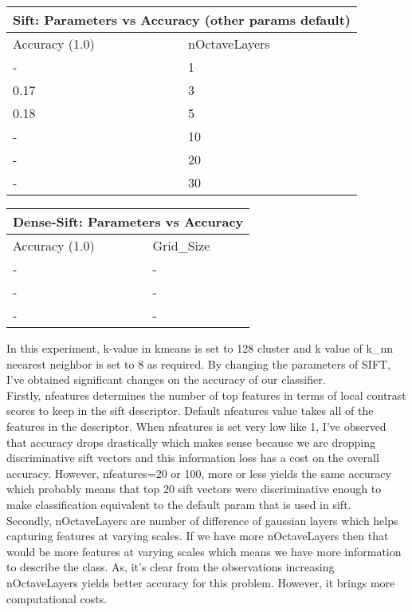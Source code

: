 \documentclass[12pt]{article}
\begin{document}
    \vspace*{0.5cm}
    \begin{tabular}{ |p{1.5cm}||p{2cm}| }
        \hline
        \multicolumn{2}{|c|}{Sift: Parameters vs Accuracy (other params default)} \\
        \hline
        Accuracy (1.0) & nOctaveLayers \\
        \hline
        - & 1 \\
        \hline
        0.17 & 3 \\
        \hline
        0.18 & 5 \\
        \hline
        - & 10 \\
        \hline
        - & 20 \\
        \hline
        - & 30 \\
        \hline
    \end{tabular}

    \vspace*{0.5cm}
        \begin{tabular}{ |p{1.5cm}||p{3cm}|  }
            \hline
            \multicolumn{2}{|c|}{Dense-Sift: Parameters vs Accuracy} \\
            \hline
            Accuracy (1.0) & Grid\_Size \\
            \hline
            - & - \\
            \hline
            - & - \\
            \hline
            - & - \\
            \hline
        \end{tabular}

    \begin{center}
        \raggedright
        In this experiment, k-value in kmeans is set to 128 cluster and k value of k\_nn neearest neighbor is set to 8 as required.
        By changing the parameters of SIFT, I've obtained significant changes on the accuracy of our classifier.
        \\
        Firstly, nfeatures determines the number of top features in terms of local contrast scores to keep in the sift descriptor. 
        Default nfeatures value takes all of the features in the descriptor. When nfeatures is set very low like 1, I've observed that accuracy drops drastically
        which makes sense because we are dropping discriminative sift vectors and this information loss has a cost on the overall accuracy.
        However, nfeatures=20 or 100, more or less yields the same accuracy which probably means that top 20 sift vectors were discriminative enough to make 
        classification equivalent to the default param that is used in sift.
        \\
        Secondly, nOctaveLayers are number of difference of gaussian layers which helps capturing features at varying scales.
        If we have more nOctaveLayers then that would be more features at varying scales which means we have more information to describe the class.
        As, it's clear from the observations increasing nOctaveLayers yields better accuracy for this problem.
        However, it brings more computational costs.

    \end{center}
\end{document}
